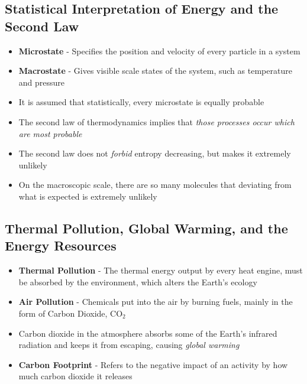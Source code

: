 \subsection{Statistical Interpretation of Energy and the Second Law}
\begin{itemize}
    \item \textbf{Microstate} - Specifies the position and velocity of every particle in a system
    \item \textbf{Macrostate} - Gives visible scale states of the system, such as temperature and pressure
    \item It is assumed that statistically, every microstate is equally probable
    \item The second law of thermodynamics implies that \emph{those processes occur which are most probable}
    \item The second law does not \emph{forbid} entropy decreasing, but makes it extremely unlikely
    \item On the macroscopic scale, there are so many molecules that deviating from what is expected is extremely unlikely
\end{itemize}

\subsection{Thermal Pollution, Global Warming, and the Energy Resources}
\begin{itemize}
    \item \textbf{Thermal Pollution} - The thermal energy output by every heat engine, must be absorbed by the environment, which alters the Earth's ecology
    \item \textbf{Air Pollution} - Chemicals put into the air by burning fuels, mainly in the form of Carbon Dioxide, CO\(_2\)
    \item Carbon dioxide in the atmosphere absorbs some of the Earth's infrared radiation and keeps it from escaping, causing \emph{global warming}
    \item \textbf{Carbon Footprint} - Refers to the negative impact of an activity by how much carbon dioxide it releases
\end{itemize}

\newpage